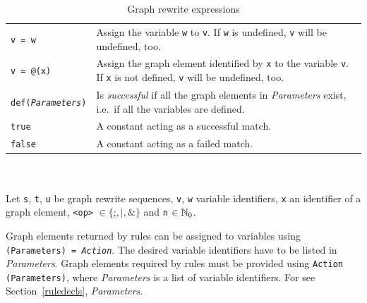 \begin{table}[htbp]
\begin{minipage}{\linewidth}
\begin{tabularx}{\linewidth}{|lX|}
\texttt{v = w}	& Assign the variable \texttt{w} to \texttt{v}. If \texttt{w} is undefined, \texttt{v} will be undefined, too.\\
\texttt{v = @(x)}	& Assign the graph element identified by \texttt{x} to the variable \texttt{v}. If \texttt{x} is not defined, \texttt{v} will be undefined, too.\\
\texttt{def(\emph{Parameters})} & Is \emph{successful} if all the graph elements in \emph{Parameters} exist, i.e.\ if all the variables are defined.\\
\texttt{true}	& A constant acting as a successful match.\\
\texttt{false}	& A constant acting as a failed match.\\ \hline
\end{tabularx}\indexmain{\texttt{;}}
\indexmain{\texttt{\&}}\indexmain{\texttt{*}}
\end{minipage}\\
\\ 
{\small Let \texttt{s}, \texttt{t}, \texttt{u} be graph rewrite sequences, \texttt{v}, \texttt{w} variable identifiers, \texttt{x} an identifier of a graph element, \texttt{<op>} $\in \{\texttt{;}, \texttt{|}, \texttt{\&}\}$ and \texttt{n} $\in \mathbb{N}_0$.}
\caption{Graph rewrite expressions}
\label{ruletab}
\end{table}
\makeatother

Graph elements returned by rules can be assigned to variables using \texttt{(Para\-meters) = \emph{Action}}. 
The desired variable identifiers have to be listed in \emph{Parameters}. 
Graph elements required by rules must be provided using \texttt{Action (Para\-meters)}, where \emph{Parameters} is a list of variable identifiers. 
For  see Section~\ref{ruledecls}, \emph{Parameters}.

